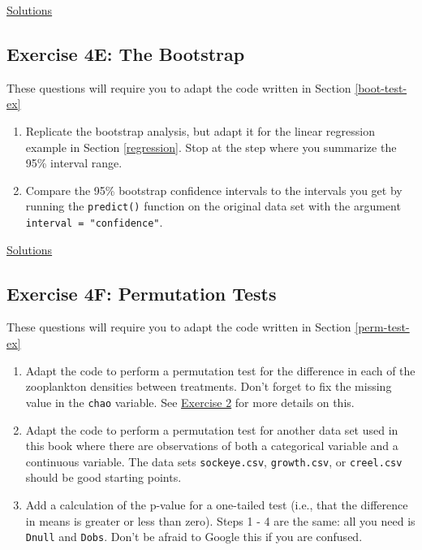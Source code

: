 \documentclass[]{book}
\providecommand{\tightlist}{%
  \setlength{\itemsep}{0pt}\setlength{\parskip}{0pt}}
\begin{document}
\protect\hyperlink{ex4d-answers}{Solutions}

\hypertarget{exercise-4e-the-bootstrap-1}{%
\subsection*{Exercise 4E: The Bootstrap}\label{exercise-4e-the-bootstrap-1}}

These questions will require you to adapt the code written in Section \ref{boot-test-ex}

\begin{enumerate}
\def\labelenumi{\arabic{enumi}.}
\tightlist
\item
  Replicate the bootstrap analysis, but adapt it for the linear regression example in Section \ref{regression}. Stop at the step where you summarize the 95\% interval range.
\item
  Compare the 95\% bootstrap confidence intervals to the intervals you get by running the \texttt{predict()} function on the original data set with the argument \texttt{interval\ =\ "confidence"}.
\end{enumerate}

\protect\hyperlink{ex4e-answers}{Solutions}

\hypertarget{exercise-4f-permutation-tests-1}{%
\subsection*{Exercise 4F: Permutation Tests}\label{exercise-4f-permutation-tests-1}}

These questions will require you to adapt the code written in Section \ref{perm-test-ex}

\begin{enumerate}
\def\labelenumi{\arabic{enumi}.}
\tightlist
\item
  Adapt the code to perform a permutation test for the difference in each of the zooplankton densities between treatments. Don't forget to fix the missing value in the \texttt{chao} variable. See \protect\hyperlink{ex1b}{Exercise 2} for more details on this.
\item
  Adapt the code to perform a permutation test for another data set used in this book where there are observations of both a categorical variable and a continuous variable. The data sets \texttt{sockeye.csv}, \texttt{growth.csv}, or \texttt{creel.csv} should be good starting points.
\item
  Add a calculation of the p-value for a one-tailed test (i.e., that the difference in means is greater or less than zero). Steps 1 - 4 are the same: all you need is \texttt{Dnull} and \texttt{Dobs}. Don't be afraid to Google this if you are confused.
\end{enumerate}
\end{document}
